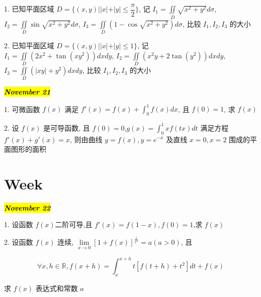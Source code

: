 1. 已知平面区域 $\displaystyle{D=\{(x,y)||x|+|y|\leq \dfrac{\pi}{2}\}}$,
记 $\displaystyle {I_{1}=\iint\limits_{D}\sqrt{x^2+y^2}d\sigma}$,
$\displaystyle{I_{2}=\iint\limits_{D}\sin\sqrt{x^2+y^2}d\sigma}$,
$\displaystyle{I_{3}=\iint\limits_{D}(1-\cos\sqrt{x^2+y^2})d\sigma}$, 比较 $I_{1},I_{2},I_{3}$ 的大小
\begin{solution}
	
\end{solution}


2. 已知平面区域 $D=\{(x,y)||x|+|y|\leq 1\}$,
记 $\displaystyle{I_{1}=\iint\limits_{D}(2x^{2}+\tan(xy^2))dxdy}$,
$\displaystyle{I_{2}=\iint\limits_{D}(x^{2}y+2\tan(y^2))dxdy}$,
$\displaystyle{I_{3}=\iint\limits_{D}(|xy|+y^2)dxdy}$, 比较 $I_{1},I_{2},I_{3}$ 的大小
\begin{solution}
	
\end{solution}

\hl{\textbf{\textit{November 21}}}

1. 可微函数 $f(x)$ 满足 $f'(x)=f(x)+\int_{0}^{1}f(x)dx$, 且 $f(0)=1$, 求 $f(x)$
\begin{solution}
	
\end{solution}

2. 设 $f(x)$ 是可导函数, 且 $f(0)=0$,$g(x)=\int_{0}^{1}xf(tx)dt$ 满足方程 $f'(x)+g'(x)=x$,
则由曲线 $y=f(x),y=e^{-x}$ 及直线 $x=0,x=2$ 围成的平面图形的面积
\begin{solution}
	
\end{solution}

\section{Week }
\hl{\textbf{\textit{November 22}}}

1. 设函数 $f(x)$二阶可导,且 $f'(x)=f(1-x),f(0)=1$,求 $f(x)$
\begin{solution}
	
\end{solution}

2. 设函数 $f(x)$ 连续, $\lim\limits_{x\rightarrow 0 }\left[ 1+f(x)\right]^{\frac{1}{x^4}}=a(a>0)$, 且

$$\forall x,h \in \mathbb{R},f(x+h)=\int_{x}^{x+h}t\left[f(t+h)+t^2 \right]dt+f(x)$$

求 $f(x)$ 表达式和常数 $a$
\begin{solution}
	
\end{solution}


